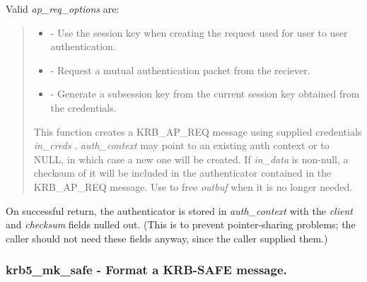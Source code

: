 \documentclass[letterpaper,10pt,english]{sphinxmanual}
\begin{document}
Valid \emph{ap\_req\_options} are:
\begin{quote}
\begin{itemize}
\item {} 
{\hyperref[appdev/refs/macros/AP_OPTS_USE_SESSION_KEY:AP_OPTS_USE_SESSION_KEY]{}} - Use the session key when creating the request used for user to user authentication.

\item {} 
{\hyperref[appdev/refs/macros/AP_OPTS_MUTUAL_REQUIRED:AP_OPTS_MUTUAL_REQUIRED]{}} - Request a mutual authentication packet from the reciever.

\item {} 
{\hyperref[appdev/refs/macros/AP_OPTS_USE_SUBKEY:AP_OPTS_USE_SUBKEY]{}} - Generate a subsession key from the current session key obtained from the credentials.

\end{itemize}

This function creates a KRB\_AP\_REQ message using supplied credentials \emph{in\_creds} . \emph{auth\_context} may point to an existing auth context or to NULL, in which case a new one will be created. If \emph{in\_data} is non-null, a checksum of it will be included in the authenticator contained in the KRB\_AP\_REQ message. Use {\hyperref[appdev/refs/api/krb5_free_data_contents:c.krb5_free_data_contents]{}} to free \emph{outbuf} when it is no longer needed.
\end{quote}

On successful return, the authenticator is stored in \emph{auth\_context} with the \emph{client} and \emph{checksum} fields nulled out. (This is to prevent pointer-sharing problems; the caller should not need these fields anyway, since the caller supplied them.)




{\hyperref[appdev/refs/api/krb5_mk_req:c.krb5_mk_req]{}}




\subsubsection{krb5\_mk\_safe -  Format a KRB-SAFE message.}
\label{appdev/refs/api/krb5_mk_safe:krb5-mk-safe-format-a-krb-safe-message}\label{appdev/refs/api/krb5_mk_safe::doc}
\end{document}
